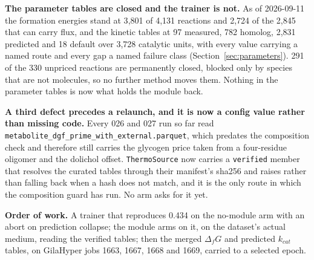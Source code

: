 

\textbf{The parameter tables are closed and the trainer is not.} As of 2026-09-11 the
formation energies stand at 3{,}801 of 4{,}131 reactions and 2{,}724 of the 2{,}845 that can
carry flux, and the kinetic tables at 97 measured, 782 homolog, 2{,}831 predicted and 18
default over 3{,}728 catalytic units, with every value carrying a named route and every gap
a named failure class (Section~\ref{sec:parameters}). 291 of the 330 unpriced reactions are
permanently closed, blocked only by species that are not molecules, so no further method
moves them. Nothing in the parameter tables is now what holds the module back.

\textbf{A third defect precedes a relaunch, and it is now a config value rather than missing
code.} Every 026 and 027 run so far read
\texttt{metabolite\_dgf\_prime\_}\allowbreak\texttt{with\_external.parquet}, which predates
the composition check and therefore still carries the glycogen price taken from a
four-residue oligomer and the dolichol offset. \texttt{ThermoSource} now carries a
\texttt{verified} member that resolves the curated tables through their manifest's sha256
and raises rather than falling back when a hash does not match, and it is the only route in
which the composition guard has run. No arm asks for it yet.

\textbf{Order of work.} A trainer that reproduces 0.434 on the no-module arm with an abort
on prediction collapse; the module arms on it, on the dataset's actual medium, reading the
verified tables; then the merged $\Delta_f G$ and predicted $k_{cat}$ tables, on GilaHyper
jobs 1663, 1667, 1668 and 1669, carried to a selected epoch.
